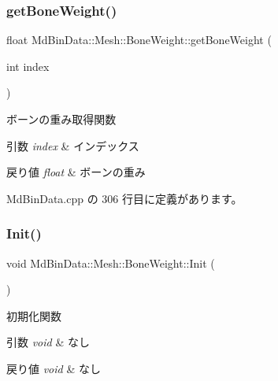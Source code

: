 \subsubsection{\texorpdfstring{get\+Bone\+Weight()}{getBoneWeight()}}
{\footnotesize\ttfamily float Md\+Bin\+Data\+::\+Mesh\+::\+Bone\+Weight\+::get\+Bone\+Weight (\begin{DoxyParamCaption}\item[{int}]{index }\end{DoxyParamCaption})}



ボーンの重み取得関数 


\begin{DoxyParams}{引数}
{\em index} & インデックス \\
\hline
\end{DoxyParams}

\begin{DoxyRetVals}{戻り値}
{\em float} & ボーンの重み \\
\hline
\end{DoxyRetVals}


 Md\+Bin\+Data.\+cpp の 306 行目に定義があります。

\mbox{\label{class_md_bin_data_1_1_mesh_1_1_bone_weight_a01430f0a589f6276dffeab831c573708}} 
\subsubsection{\texorpdfstring{Init()}{Init()}}
{\footnotesize\ttfamily void Md\+Bin\+Data\+::\+Mesh\+::\+Bone\+Weight\+::\+Init (\begin{DoxyParamCaption}{ }\end{DoxyParamCaption})}



初期化関数 


\begin{DoxyParams}{引数}
{\em void} & なし \\
\hline
\end{DoxyParams}

\begin{DoxyRetVals}{戻り値}
{\em void} & なし \\
\hline
\end{DoxyRetVals}


